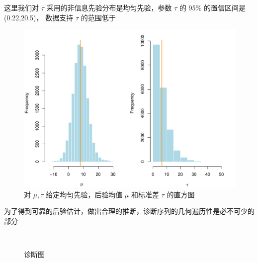 \documentclass[12pt,a4paper,UTF8,twoside]{book}
\theoremstyle{definition}
\theoremstyle{definition}
\theoremstyle{definition}
\theoremstyle{remark}
\begin{document}
这里我们对 \(\tau\) 采用的非信息先验分布是均匀先验，参数 \(\tau\) 的
95\% 的置信区间是 (0.22,20.5)， 数据支持 \(\tau\) 的范围低于

\begin{figure}

{\centering \includegraphics[width=0.7\linewidth]{figures/posterior_mu_tau} 

}

\caption{对 $\mu,\tau$ 给定均匀先验，后验均值 $\mu$ 和标准差 $\tau$ 的直方图}\label{fig:posterior-mu-tau}
\end{figure}

为了得到可靠的后验估计，做出合理的推断，诊断序列的几何遍历性是必不可少的部分

\begin{figure}

{\centering {}\\

}

\caption{诊断图}\label{fig:diagnostic}
\end{figure}
\end{document}
